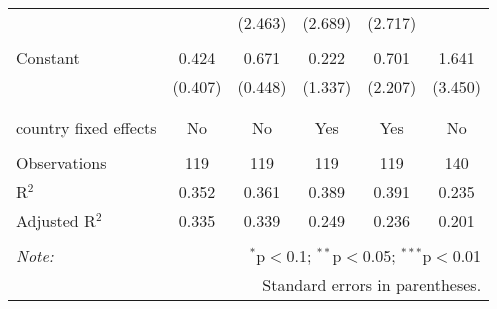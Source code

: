 \begin{tabular}{@{\extracolsep{5pt}}lccccc}
  &  & (2.463) & (2.689) & (2.717) &  \\ 
  & & & & & \\ 
 Constant & 0.424 & 0.671 & 0.222 & 0.701 & 1.641 \\ 
  & (0.407) & (0.448) & (1.337) & (2.207) & (3.450) \\ 
  & & & & & \\ 
\hline \\[-1.8ex] 
country fixed effects & No & No & Yes & Yes & No \\ 
\hline \\[-1.8ex] 
Observations & 119 & 119 & 119 & 119 & 140 \\ 
R$^{2}$ & 0.352 & 0.361 & 0.389 & 0.391 & 0.235 \\ 
Adjusted R$^{2}$ & 0.335 & 0.339 & 0.249 & 0.236 & 0.201 \\ 
\hline 
\hline \\[-1.8ex] 
\textit{Note:}  & \multicolumn{5}{r}{$^{*}$p$<$0.1; $^{**}$p$<$0.05; $^{***}$p$<$0.01} \\ 
 & \multicolumn{5}{r}{Standard errors in parentheses.} \\ 
\end{tabular} 
\endgroup 
